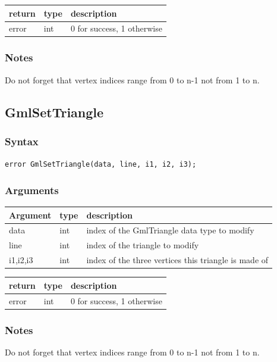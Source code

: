 \documentclass[a4paper,12pt]{article}
\begin{document}
\medskip

\begin{tabular}{|m{2cm}|m{1.5cm}|m{10.5cm}|}
\hline
return     & type   & description \\
\hline
error      & int    & 0 for success, 1 otherwise \\
\hline
\end{tabular}
\subsubsection*{Notes}
Do not forget that vertex indices range from 0 to n-1 not from 1 to n.


\subsection{GmlSetTriangle}
\subsubsection*{Syntax}
{\tt error GmlSetTriangle(data, line, i1, i2, i3);}
\subsubsection*{Arguments}

\begin{tabular}{|m{2cm}|m{1.5cm}|m{10.5cm}|}
\hline
Argument   & type   & description \\
\hline
data       & int    & index of the GmlTriangle data type to modify \\
\hline
line       & int    & index of the triangle to modify \\
\hline
i1,i2,i3   & int    & index of the three vertices this triangle is made of \\
\hline
\end{tabular}

\medskip

\begin{tabular}{|m{2cm}|m{1.5cm}|m{10.5cm}|}
\hline
return     & type   & description \\
\hline
error      & int    & 0 for success, 1 otherwise \\
\hline
\end{tabular}
\subsubsection*{Notes}
Do not forget that vertex indices range from 0 to n-1 not from 1 to n.
\end{document}
